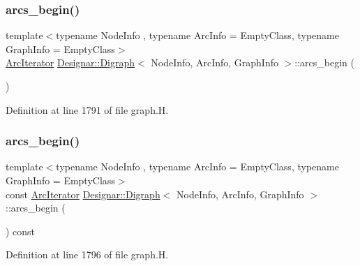 \subsubsection{\texorpdfstring{arcs\+\_\+begin()}{arcs\_begin()}\hspace{0.1cm}{\footnotesize\ttfamily [1/4]}}
{\footnotesize\ttfamily template$<$typename Node\+Info , typename Arc\+Info  = Empty\+Class, typename Graph\+Info  = Empty\+Class$>$ \\
\hyperlink{class_designar_1_1_digraph_1_1_arc_iterator}{Arc\+Iterator} \hyperlink{class_designar_1_1_digraph}{Designar\+::\+Digraph}$<$ Node\+Info, Arc\+Info, Graph\+Info $>$\+::arcs\+\_\+begin (\begin{DoxyParamCaption}{ }\end{DoxyParamCaption})\hspace{0.3cm}{\ttfamily [inline]}}



Definition at line 1791 of file graph.\+H.

\mbox{\label{class_designar_1_1_digraph_a1334cd9030f2a409f03a611bb472f5cb}} 
\subsubsection{\texorpdfstring{arcs\+\_\+begin()}{arcs\_begin()}\hspace{0.1cm}{\footnotesize\ttfamily [2/4]}}
{\footnotesize\ttfamily template$<$typename Node\+Info , typename Arc\+Info  = Empty\+Class, typename Graph\+Info  = Empty\+Class$>$ \\
const \hyperlink{class_designar_1_1_digraph_1_1_arc_iterator}{Arc\+Iterator} \hyperlink{class_designar_1_1_digraph}{Designar\+::\+Digraph}$<$ Node\+Info, Arc\+Info, Graph\+Info $>$\+::arcs\+\_\+begin (\begin{DoxyParamCaption}{ }\end{DoxyParamCaption}) const\hspace{0.3cm}{\ttfamily [inline]}}



Definition at line 1796 of file graph.\+H.

\mbox{\label{class_designar_1_1_digraph_a3c1eeda482f59951e1191ea2e0dd514a}} 
